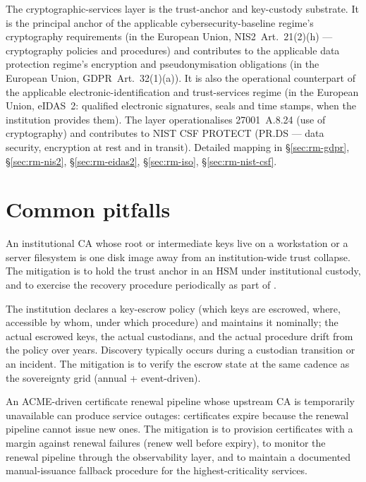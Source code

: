 \noindent The cryptographic-services layer is the
trust-anchor and key-custody substrate. It is the principal
anchor of the applicable cybersecurity-baseline regime's
cryptography requirements (in the European Union, NIS2~Art.~21(2)(h)
--- cryptography policies and procedures) and contributes to the
applicable data protection regime's encryption and pseudonymisation
obligations (in the European Union, GDPR~Art.~32(1)(a)).
It is also the operational counterpart of the applicable
electronic-identification and trust-services regime
(in the European Union, eIDAS~2: qualified electronic
signatures, seals and time stamps, when the institution
provides them). The layer
operationalises 27001~A.8.24 (use of cryptography) and
contributes to NIST CSF \textsf{PROTECT} (PR.DS --- data
security, encryption at rest and in transit). Detailed
mapping in 
\S\ref{sec:rm-gdpr}, \S\ref{sec:rm-nis2},
\S\ref{sec:rm-eidas2}, \S\ref{sec:rm-iso},
\S\ref{sec:rm-nist-csf}.

\section{Common pitfalls}
\label{sec:cr-pitfalls}

\begin{pitfallbox}
\noindent An institutional CA whose root or intermediate keys live
on a workstation or a server filesystem is one disk image away
from an institution-wide trust collapse. The mitigation is to hold
the trust anchor in an HSM under institutional custody, and to
exercise the recovery procedure periodically as part of
.
\end{pitfallbox}

\begin{pitfallbox}
\noindent The institution declares a key-escrow policy (which keys
are escrowed, where, accessible by whom, under which procedure)
and maintains it nominally; the actual escrowed keys, the actual
custodians, and the actual procedure drift from the policy over
years. Discovery typically occurs during a custodian transition
or an incident. The mitigation is to verify the escrow state at
the same cadence as the sovereignty grid (annual + event-driven).
\end{pitfallbox}

\begin{pitfallbox}
\noindent An ACME-driven certificate renewal pipeline whose
upstream CA is temporarily unavailable can produce service
outages: certificates expire because the renewal pipeline cannot
issue new ones. The mitigation is to provision certificates with a
margin against renewal failures (renew well before expiry), to
monitor the renewal pipeline through the observability layer, and
to maintain a documented manual-issuance fallback procedure for
the highest-criticality services.
\end{pitfallbox}

